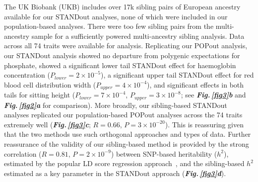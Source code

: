 \documentclass[12pt]{zHenriquesLab-StyleBioRxiv}
\newcommand\dref[2]{\normalsize{\textbf{\textit{Fig.\,\ref{#1}#2}}}\normalsize{}}
\begin{document}
The UK Biobank (UKB) includes over 17k sibling pairs of European ancestry available for our STANDout analyses, 
none of which were included in our population-based analyses. There were too few sibling pairs from the 
multi-ancestry sample for a sufficiently powered multi-ancestry sibling analysis. 
Data across all 74 traits were available for analysis. Replicating our POPout analysis, 
our STANDout analysis showed no departure from polygenic expectations for phosphate, showed 
a significant lower tail STANDout effect for haemoglobin concentration ($P_{lower}=2 \times 10^{-5}$), a 
significant upper tail STANDout effect for red blood cell distribution width ($P_{upper}=4 \times 10^{-4}$), 
and significant effects in both tails for sitting height 
($P_{lower}=7 \times 10^{-4}$, $P_{upper}=3 \times 10^{-8}$; see \dref{fig3}{b} and \dref{fig2}{a} for comparison). 
More broadly, our sibling-based STANDout analyses replicated our population-based POPout analyses across 
the 74 traits extremely well (\dref{fig3}{c}; $R = 0.66$, $P = 3 \times 10^{-20}$). This is reassuring given that the 
two methods use such orthogonal approaches and types of data. Further reassurance of the validity of our 
sibling-based method is provided by the strong correlation ($R = 0.81$, $P = 2 \times 10^{-9}$) between 
SNP-based heritability ($h^2$), estimated by the popular LD score regression approach~\cite{BulikSullivan2015}, 
and the sibling-based $h^2$ estimated as a key parameter in the STANDout approach (\dref{fig3}{d}).

%
\end{document}
